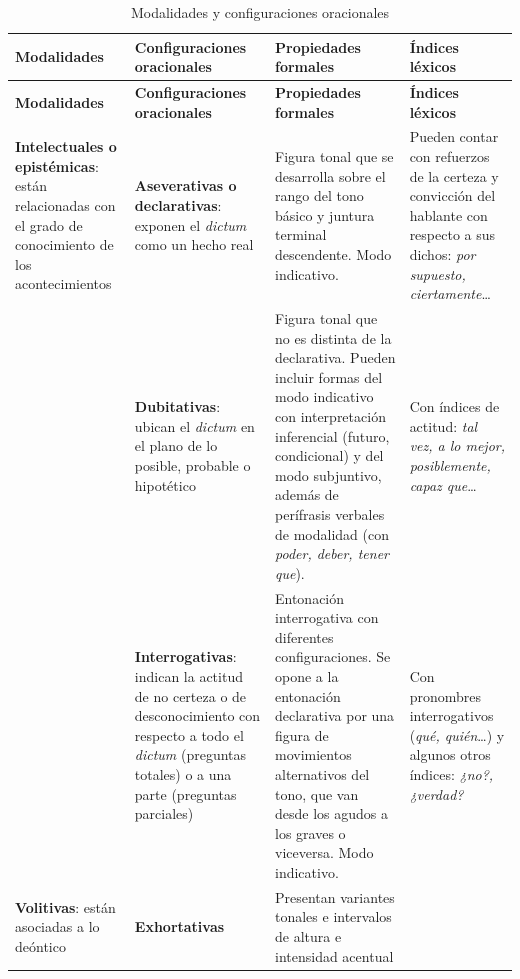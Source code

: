 {\scriptsize\setlength{\tabcolsep}{2pt}
\begin{longtable}{@{}>{\raggedright\arraybackslash}p{23mm}
    >{\raggedright\arraybackslash}p{25mm} >{\raggedright\arraybackslash}p{45mm}
    >{\raggedright\arraybackslash}p{30mm}@{}}
  \caption{Modalidades y configuraciones oracionales \parencite[a partir
    de][]{kovacci1992}}\label{tab:14-kovacci}\\
  \toprule
  \textbf{Modalidades} & \textbf{Configuraciones oracionales} &
    \textbf{Propiedades formales} & \textbf{Índices léxicos} \\
  \midrule
  \endfirsthead
  \toprule
  \textbf{Modalidades} & \textbf{Configuraciones oracionales} &
    \textbf{Propiedades formales} & \textbf{Índices léxicos} \\
  \midrule
  \endhead
  \textbf{Intelectuales o epistémicas}: están relacionadas con el grado de
    conocimiento de los acontecimientos &
    \textbf{Aseverativas o declarativas}: exponen el \textit{dictum} como un
    hecho real &
    Figura tonal que se desarrolla sobre el rango del tono básico y juntura
    terminal descendente. Modo indicativo. &
    Pueden contar con refuerzos de la certeza y convicción del hablante con
    respecto a sus dichos: \textit{por supuesto, ciertamente}\ldots \\
  \addlinespace
  & \textbf{Dubitativas}: ubican el \textit{dictum} en el plano de lo posible,
    probable o hipotético &
    Figura tonal que no es distinta de la declarativa. Pueden incluir formas del
    modo indicativo con interpretación inferencial (futuro, condicional) y del
    modo subjuntivo, además de perífrasis verbales de modalidad (con
    \textit{poder, deber, tener que}). &
    Con índices de actitud: \textit{tal vez, a lo mejor, posiblemente, capaz
    que}\ldots \\
  \addlinespace
  & \textbf{Interrogativas}: indican la actitud de no certeza o de
    desconocimiento con respecto a todo el \textit{dictum} (preguntas totales) o
    a una parte (preguntas parciales) &
    Entonación interrogativa con diferentes configuraciones. Se opone a la
    entonación declarativa por una figura de movimientos alternativos del tono,
    que van desde los agudos a los graves o viceversa. Modo indicativo. &
    Con pronombres interrogativos (\textit{qué, quién}\ldots) y algunos otros
    índices: \textit{¿no?, ¿verdad?} \\
  \midrule
  \textbf{Volitivas}: están asociadas a lo deóntico &
    \textbf{Exhortativas} &
    Presentan variantes tonales e intervalos de altura e intensidad acentual

\end{longtable}}
